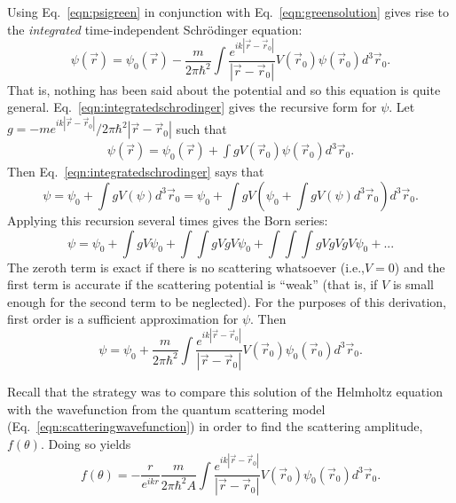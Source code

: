 Using Eq.~\eqref{eqn:psigreen} in conjunction with Eq.~\eqref{eqn:greensolution} gives rise to the \emph{integrated} time-independent Schr\"{o}dinger equation:
%
\begin{equation} \label{eqn:integratedschrodinger}
\psi(\vec{r})=\psi_0 (\vec{r})-\frac{m}{2\pi\hbar^2}\int\frac{e^{ik|\vec{r}-\vec{r}_0|}}{|\vec{r}-\vec{r}_0|}V(\vec{r}_0)\psi(\vec{r}_0)d^3\vec{r}_0.
\end{equation}
%
That is, nothing has been said about the potential and so this equation is quite general. Eq.~\eqref{eqn:integratedschrodinger} gives the recursive form for $\psi$. Let $g=-me^{ik|\vec{r}-\vec{r}_0|}/2\pi\hbar^2|\vec{r}-\vec{r}_0|$ such that
\begin{align*}
\psi(\vec{r})=\psi_0 (\vec{r})+\int gV(\vec{r}_0)\psi(\vec{r}_0)d^3\vec{r}_0.
\end{align*}
Then Eq.~\eqref{eqn:integratedschrodinger} says that
%
\begin{equation} \nonumber
\psi=\psi_0+\int gV\left(\psi\right) d^3\vec{r}_0= \psi_0+\int gV \left(\psi_0+\int gV\left(\psi\right)d^3\vec{r}_0\right)d^3\vec{r}_0.
\end{equation}
%
Applying this recursion several times gives the Born series:
%
\begin{equation}\nonumber
\psi=\psi_0+\int gV\psi_0+\int \int gVgV\psi_0 + \int \int \int gVgVgV\psi_0 + ...
\end{equation}
%
The zeroth term is exact if there is no scattering whatsoever (i.e.,$V=0$) and the first term is accurate if the scattering potential is ``weak'' (that is, if $V$ is small enough for the second term to be neglected). For the purposes of this derivation, first order is a sufficient approximation for $\psi$. Then
%
\begin{equation} \nonumber
\psi=\psi_0+\frac{m}{2\pi\hbar^2}\int\frac{e^{ik|\vec{r}-\vec{r}_0|}}{|\vec{r}-\vec{r}_0|}V(\vec{r}_0)\psi_0(\vec{r}_0) d^3\vec{r}_0.
\end{equation}

Recall that the strategy was to compare this solution of the Helmholtz equation with the wavefunction from the quantum scattering model (Eq.~\eqref{eqn:scatteringwavefunction}) in order to find the scattering amplitude, $f(\theta)$. Doing so yields
%
\begin{equation} \nonumber
f(\theta)=-\frac{r}{e^{ikr}}\frac{m}{2\pi\hbar^2A}\int\frac{e^{ik|\vec{r}-\vec{r}_0|}}{|\vec{r}-\vec{r}_0|}V(\vec{r}_0)\psi_0(\vec{r}_0)d^3\vec{r}_0.
\end{equation}
%

